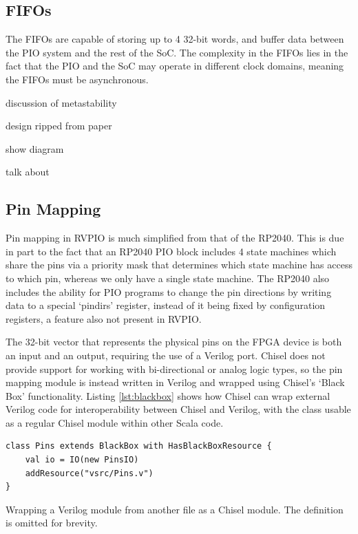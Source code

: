 \subsection{FIFOs}

The FIFOs are capable of storing up to 4 32-bit words, and buffer data between the PIO system and the rest of the SoC. The complexity in the FIFOs lies in the fact that the PIO and the SoC may operate in different clock domains, meaning the FIFOs must be asynchronous.

discussion of metastability

design ripped from paper

show diagram

talk about


\subsection{Pin Mapping}

Pin mapping in RVPIO is much simplified from that of the RP2040. This is due in part to the fact that an RP2040 PIO block includes 4 state machines which share the pins via a priority mask that determines which state machine has access to which pin, whereas we only have a single state machine. The RP2040 also includes the ability for PIO programs to change the pin directions by writing data to a special `pindirs' register, instead of it being fixed by configuration registers, a feature also not present in RVPIO.

The 32-bit vector that represents the physical pins on the FPGA device is both an input and an output, requiring the use of a Verilog  port. Chisel does not provide support for working with bi-directional or analog logic types, so the pin mapping module is instead written in Verilog and wrapped using Chisel's `Black Box' functionality. Listing \ref{lst:blackbox} shows how Chisel can wrap external Verilog code for interoperability between Chisel and Verilog, with the  class usable as a regular Chisel module within other Scala code.

\begin{listing}[h!]
    \centering
    \vspace{0.5cm}
    \begin{verbatim}
class Pins extends BlackBox with HasBlackBoxResource {
    val io = IO(new PinsIO)
    addResource("vsrc/Pins.v")
}
    \end{verbatim}
    \caption{Wrapping a Verilog module from another file as a Chisel module. The  definition is omitted for brevity.}
    \label{lst:blackbox}
\end{listing}

